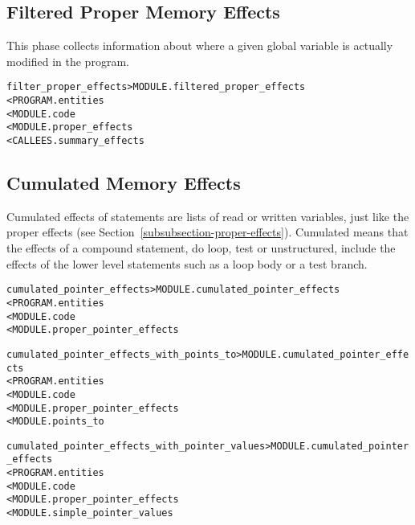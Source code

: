 \documentclass[a4paper]{report}
\newenvironment{PipsMake}{\begin{alltt}}{\end{alltt}}
\newenvironment{PipsPass}[1]{\label{pass:#1}}{}
\begin{document}
\subsection{Filtered Proper Memory Effects}
\label{subsubsection-filtered-proper-effects}

\begin{PipsPass}{filter_proper_effects}
This phase collects information about where a given global variable is
actually modified in the program.
\end{PipsPass}


\begin{PipsMake}
filter_proper_effects         > MODULE.filtered_proper_effects
        < PROGRAM.entities
        < MODULE.code
        < MODULE.proper_effects
        < CALLEES.summary_effects
\end{PipsMake}


\subsection{Cumulated Memory Effects}
\label{subsubsection-cumulated-effects}

\begin{PipsPass}{cumulated_effects}
Cumulated effects of statements are lists of read or written
variables, just like the proper effects (see Section~\ref{subsubsection-proper-effects}). Cumulated means that the effects of a compound statement, do
loop, test or unstructured, include the effects of the lower level
statements such as a loop body or a test branch.
\end{PipsPass}

\begin{PipsMake}
cumulated_pointer_effects   > MODULE.cumulated_pointer_effects
        < PROGRAM.entities
        < MODULE.code
        < MODULE.proper_pointer_effects
\end{PipsMake}

\begin{PipsMake}
cumulated_pointer_effects_with_points_to > MODULE.cumulated_pointer_effects
        < PROGRAM.entities
        < MODULE.code
        < MODULE.proper_pointer_effects
        < MODULE.points_to
\end{PipsMake}

\begin{PipsMake}
cumulated_pointer_effects_with_pointer_values > MODULE.cumulated_pointer_effects
        < PROGRAM.entities
        < MODULE.code
        < MODULE.proper_pointer_effects
        < MODULE.simple_pointer_values
\end{PipsMake}
\end{document}
